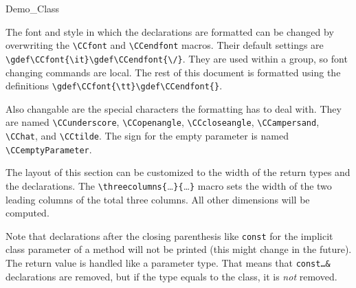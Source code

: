 \begin{class}{Demo_Class}
{  



The font and style in which the declarations are formatted can be
changed by overwriting the \verb"\CCfont" and \verb"\CCendfont"
macros. Their default settings are
\verb"\gdef\CCfont{\it}\gdef\CCendfont{\/}". They are used within a
group, so font changing commands are local. The rest of this document is
formatted using the definitions \verb"\gdef\CCfont{\tt}\gdef\CCendfont{}".

\gdef\CCfont{\tt}\gdef\CCendfont{}

Also changable are the special characters the formatting has to
deal with. They are named \verb"\CCunderscore", \verb"\CCopenangle",
\verb"\CCcloseangle", \verb"\CCampersand", \verb"\CChat", and
\verb"\CCtilde". The sign for the empty parameter is named
\verb"\CCemptyParameter".

  \operations
  \threecolumns{2.8cm}{2.8cm}

The layout of this section can be customized to the width of the
return types and the declarations. The
\verb"\threecolumns{"\ldots\verb"}{"\ldots\verb"}" macro sets the
width of the two leading columns of the total three columns. All other
dimensions will be computed.

Note that declarations after the closing parenthesis like {\tt const}
for the implicit class parameter of a method will not be printed
(this might change in the future).
The return value is handled like a parameter type. That means that
{\tt const\ldots\&} declarations are removed, but if the type equals
to the class, it is {\em not} removed.




}
\end{class}
